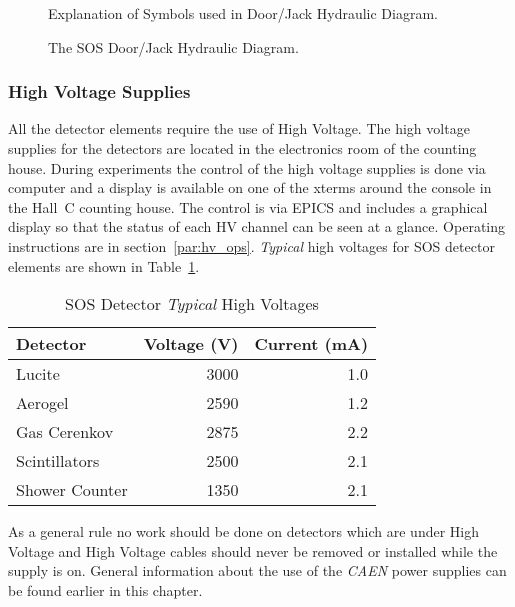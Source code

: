 \begin{figure}
\caption{Explanation of Symbols used in Door/Jack Hydraulic 
Diagram. \label{fig:SOSdoorHydSym}}
\end{figure}
\clearpage

\begin{figure}
\caption{The SOS Door/Jack Hydraulic Diagram. \label{fig:SOSdoorHydDiag}}
\end{figure}
\clearpage


\subsubsection{High Voltage Supplies }

All the detector elements require the use of High Voltage. The
high voltage supplies for the detectors are located in the 
electronics room of the counting house.
During experiments the control of the high voltage supplies is done via
computer and a display is available on one of the xterms around
the console in the Hall~C counting house. The control is via
EPICS and includes a graphical display so that the status of each
HV channel can be seen at a glance. Operating instructions are
in section~\ref{par:hv_ops}. {\em Typical} high voltages for
SOS detector elements are shown in Table~\ref{tab:sos_hv}.

\begin{table}[!hbt]\centering
   \caption{SOS Detector {\em Typical} High Voltages\label{tab:sos_hv}}
   \begin{tabular}{lrr}
      Detector & Voltage (V) & Current (mA)\\
      \hline
      Lucite         & 3000  & 1.0 \\
      Aerogel        & 2590  & 1.2 \\
      Gas Cerenkov   & 2875  & 2.2 \\
      Scintillators  & 2500  & 2.1 \\
      Shower Counter & 1350  & 2.1 \\
      \hline
   \end{tabular}
\end{table}

As a general rule no work should be done on detectors which are under
High Voltage and
High Voltage cables should never be removed or installed while the supply is on.
General information about the use of the {\em CAEN} power supplies can be
found earlier in this chapter.


